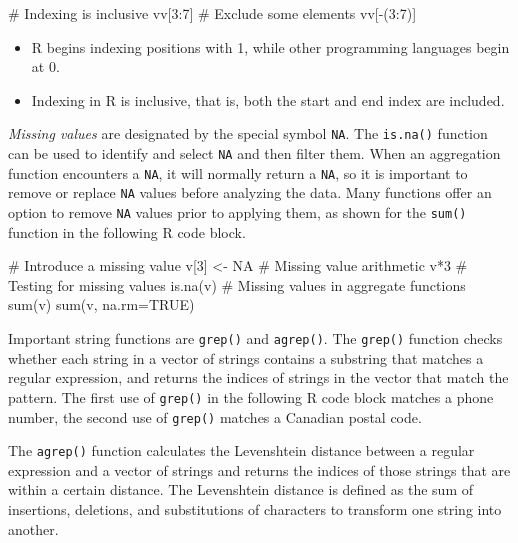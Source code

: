 \begin{Rcode}
# Indexing is inclusive
vv[3:7]
# Exclude some elements
vv[-(3:7)]
\end{Rcode}

\begin{alertbox}
\begin{itemize}
   \item R begins indexing positions with 1, while other programming languages begin at 0.
   \item Indexing in R is inclusive, that is, both the start and end index are included.
\end{itemize}
\end{alertbox}

\emph{Missing values} are designated by the special symbol \texttt{NA}. The \texttt{is.na()} function can be used to identify and select \texttt{NA} and then filter them. When an aggregation function encounters a \texttt{NA}, it will normally return a \texttt{NA}, so it is important to remove or replace \texttt{NA} values before analyzing the data. Many functions offer an option to remove \texttt{NA} values prior to applying them, as shown for the \texttt{sum()} function in the following R code block. 

\begin{Rcode}
# Introduce a missing value
v[3] <- NA
# Missing value arithmetic
v*3
# Testing for missing values
is.na(v)
# Missing values in aggregate functions
sum(v)
sum(v, na.rm=TRUE)
\end{Rcode}

Important string functions are \texttt{grep()} and \texttt{agrep()}. The \texttt{grep()} function checks whether each string in a vector of strings contains a substring that matches a regular expression, and returns the indices of strings in the vector that match the pattern. The first use of \texttt{grep()} in the following R code block matches a phone number, the second use of \texttt{grep()} matches a Canadian postal code.


The \texttt{agrep()} function calculates the Levenshtein distance between a regular expression and a vector of strings and returns the indices of those strings that are within a certain distance. The Levenshtein distance is defined as the sum of insertions, deletions, and substitutions of characters to transform one string into another.

